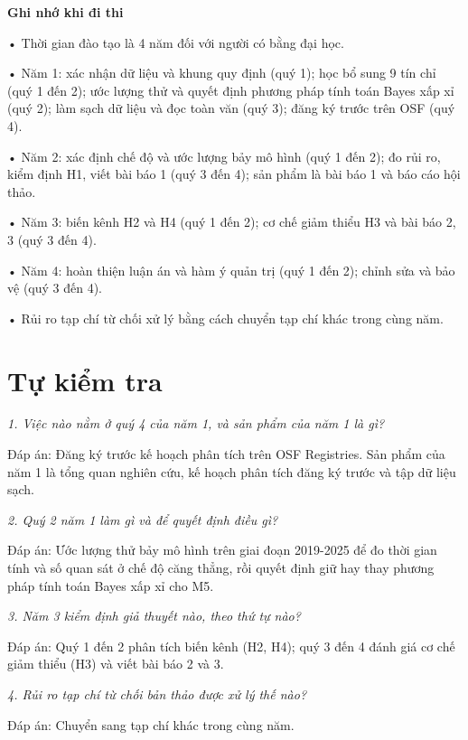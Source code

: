 \begin{tcolorbox}[breakable]
\textbf{Ghi nhớ khi đi thi}

• Thời gian đào tạo là 4 năm đối với người có bằng đại học.

• Năm 1: xác nhận dữ liệu và khung quy định (quý 1); học bổ sung 9 tín chỉ (quý 1 đến 2); ước lượng thử và quyết định phương pháp tính toán Bayes xấp xỉ (quý 2); làm sạch dữ liệu và đọc toàn văn (quý 3); đăng ký trước trên OSF (quý 4).

• Năm 2: xác định chế độ và ước lượng bảy mô hình (quý 1 đến 2); đo rủi ro, kiểm định H1, viết bài báo 1 (quý 3 đến 4); sản phẩm là bài báo 1 và báo cáo hội thảo.

• Năm 3: biến kênh H2 và H4 (quý 1 đến 2); cơ chế giảm thiểu H3 và bài báo 2, 3 (quý 3 đến 4).

• Năm 4: hoàn thiện luận án và hàm ý quản trị (quý 1 đến 2); chỉnh sửa và bảo vệ (quý 3 đến 4).

• Rủi ro tạp chí từ chối xử lý bằng cách chuyển tạp chí khác trong cùng năm.
\end{tcolorbox}

\section{Tự kiểm tra}

{\itshape 1. Việc nào nằm ở quý 4 của năm 1, và sản phẩm của năm 1 là gì?\par}

Đáp án: Đăng ký trước kế hoạch phân tích trên OSF Registries. Sản phẩm của năm 1 là tổng quan nghiên cứu, kế hoạch phân tích đăng ký trước và tập dữ liệu sạch.

{\itshape 2. Quý 2 năm 1 làm gì và để quyết định điều gì?\par}

Đáp án: Ước lượng thử bảy mô hình trên giai đoạn 2019-2025 để đo thời gian tính và số quan sát ở chế độ căng thẳng, rồi quyết định giữ hay thay phương pháp tính toán Bayes xấp xỉ cho M5.

{\itshape 3. Năm 3 kiểm định giả thuyết nào, theo thứ tự nào?\par}

Đáp án: Quý 1 đến 2 phân tích biến kênh (H2, H4); quý 3 đến 4 đánh giá cơ chế giảm thiểu (H3) và viết bài báo 2 và 3.

{\itshape 4. Rủi ro tạp chí từ chối bản thảo được xử lý thế nào?\par}

Đáp án: Chuyển sang tạp chí khác trong cùng năm.

